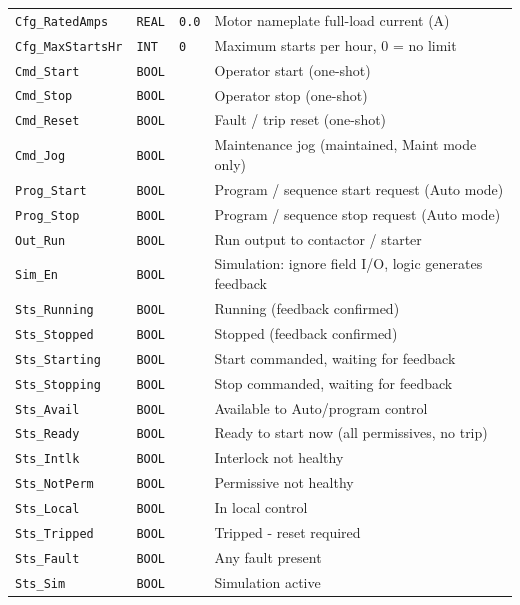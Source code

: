 {\begin{longtable}{@{}>{\raggedright\arraybackslash}p{3.4cm}>{\raggedright\arraybackslash}p{3.3cm}>{\raggedright\arraybackslash}p{1.3cm}>{\raggedright\arraybackslash}p{6.4cm}@{}}
\texttt{Cfg\_RatedAmps} & \texttt{REAL} & \texttt{0.0} & Motor nameplate full-load current (A) \\
\texttt{Cfg\_MaxStartsHr} & \texttt{INT} & \texttt{0} & Maximum starts per hour, 0 = no limit \\
\texttt{Cmd\_Start} & \texttt{BOOL} &  & Operator start (one-shot) \\
\texttt{Cmd\_Stop} & \texttt{BOOL} &  & Operator stop (one-shot) \\
\texttt{Cmd\_Reset} & \texttt{BOOL} &  & Fault /\allowbreak{} trip reset (one-shot) \\
\texttt{Cmd\_Jog} & \texttt{BOOL} &  & Maintenance jog (maintained, Maint mode only) \\
\texttt{Prog\_Start} & \texttt{BOOL} &  & Program /\allowbreak{} sequence start request (Auto mode) \\
\texttt{Prog\_Stop} & \texttt{BOOL} &  & Program /\allowbreak{} sequence stop request (Auto mode) \\
\texttt{Out\_Run} & \texttt{BOOL} &  & Run output to contactor /\allowbreak{} starter \\
\texttt{Sim\_En} & \texttt{BOOL} &  & Simulation: ignore field I/\allowbreak{}O, logic generates feedback \\
\texttt{Sts\_Running} & \texttt{BOOL} &  & Running (feedback confirmed) \\
\texttt{Sts\_Stopped} & \texttt{BOOL} &  & Stopped (feedback confirmed) \\
\texttt{Sts\_Starting} & \texttt{BOOL} &  & Start commanded, waiting for feedback \\
\texttt{Sts\_Stopping} & \texttt{BOOL} &  & Stop commanded, waiting for feedback \\
\texttt{Sts\_Avail} & \texttt{BOOL} &  & Available to Auto/\allowbreak{}program control \\
\texttt{Sts\_Ready} & \texttt{BOOL} &  & Ready to start now (all permissives, no trip) \\
\texttt{Sts\_Intlk} & \texttt{BOOL} &  & Interlock not healthy \\
\texttt{Sts\_NotPerm} & \texttt{BOOL} &  & Permissive not healthy \\
\texttt{Sts\_Local} & \texttt{BOOL} &  & In local control \\
\texttt{Sts\_Tripped} & \texttt{BOOL} &  & Tripped - reset required \\
\texttt{Sts\_Fault} & \texttt{BOOL} &  & Any fault present \\
\texttt{Sts\_Sim} & \texttt{BOOL} &  & Simulation active \\

\end{longtable}}
